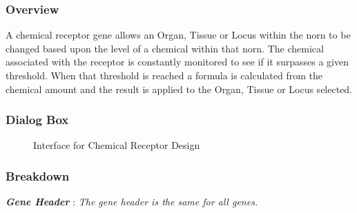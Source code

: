 \documentclass[11pt,twoside,a4paper]{article}
\begin{document}
\begin{minipage}{0.5\linewidth}
\subsubsection{Overview}
A chemical receptor gene allows an Organ, Tissue or Locus within the norn to be changed based upon the level of a chemical within that norn. The chemical associated with the receptor is constantly monitored to see if it surpasses a given threshold. When that threshold is reached a formula is calculated from the chemical amount and the result is applied to the Organ, Tissue or Locus selected.
\end{minipage}
\begin{minipage}{0.1\linewidth}\end{minipage}
\begin{minipage}{0.5\linewidth}
\subsubsection{Dialog Box}
\begin{figure}[H]
	\centerline {} %
	\caption{Interface for Chemical Receptor Design}
	\label{fig:chemical_receptor}
\end{figure}
\end{minipage}

\subsubsection{Breakdown}

\textbf{\textit{Gene Header}} : \emph{The gene header is the same for all genes. }~\\


\end{document}
